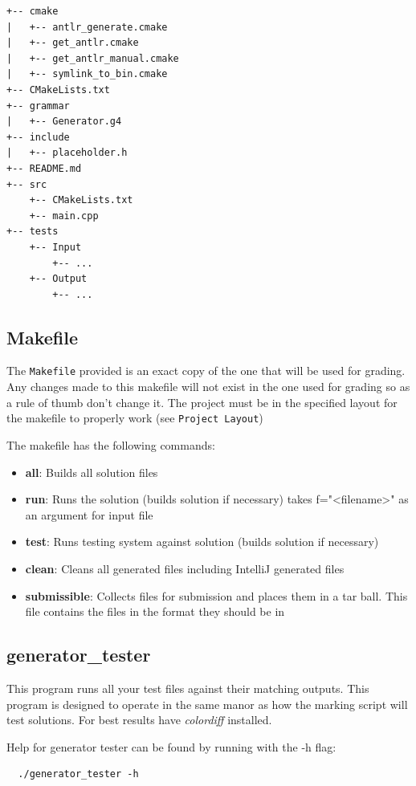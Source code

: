 \documentclass{article}
\begin{document}
\begin{lstlisting}
+-- cmake
|   +-- antlr_generate.cmake
|   +-- get_antlr.cmake
|   +-- get_antlr_manual.cmake
|   +-- symlink_to_bin.cmake
+-- CMakeLists.txt
+-- grammar
|   +-- Generator.g4
+-- include
|   +-- placeholder.h
+-- README.md
+-- src
    +-- CMakeLists.txt
    +-- main.cpp
+-- tests
    +-- Input
        +-- ...
    +-- Output
        +-- ...
\end{lstlisting}


\subsection{Makefile}
The \texttt{Makefile} provided is an exact copy of the one that will be used for grading.  Any changes made to
this makefile will not exist in the one used for grading so as a rule of thumb don't change it. The project must
be in the specified layout for the makefile to properly work (see \texttt{Project Layout})

The makefile has the following commands:
\begin{itemize}
  \item{\textbf{all}}: Builds all solution files
  \item{\textbf{run}}: Runs the solution (builds solution if necessary) takes f="<filename>" as an argument for
    input file
  \item{\textbf{test}}: Runs testing system against solution (builds solution if necessary)
  \item{\textbf{clean}}: Cleans all generated files including IntelliJ generated files
  \item{\textbf{submissible}}: Collects files for submission and places them in a tar ball. This file contains
  the files in the format they should be in
\end{itemize}

\subsection{generator\_tester}
This program runs all your test files against their matching outputs. This program is designed to operate in the
same manor as how the marking script will test solutions. For best results have \textit{colordiff} installed.

Help for generator tester can be found by running with the -h flag:
\begin{lstlisting}
  ./generator_tester -h
\end{lstlisting}
\end{document}
